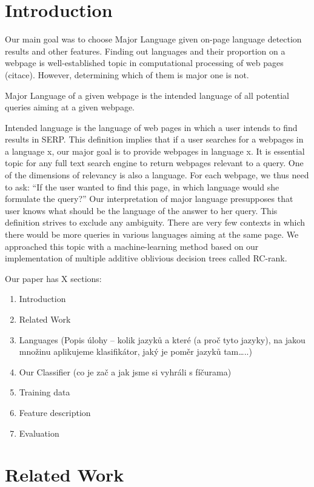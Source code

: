 \documentclass{acm_proc_article-sp}
\begin{document}
\section{Introduction}
  Our main goal was to choose Major Language given on-page language detection results and other features. Finding out languages and their proportion on a webpage is well-established topic in computational processing of web pages (citace). However, determining which of them is major one is not.

  Major Language of a given webpage is the intended language of all potential queries aiming at a given webpage. 

  Intended language is the language of web pages in which a user intends to find results in SERP. This definition implies that if a user searches for a webpages in a language x, our major goal is to provide webpages in language x.
  It is essential topic for any full text search engine to return webpages relevant to a query. One of the dimensions of relevancy is also a language. For each webpage, we thus need to ask: “If the user wanted to find this page, in which language would she formulate the query?” Our interpretation of major language presupposes that user knows what should be the language of the answer to her query.
  This definition strives to exclude any ambiguity. There are very few contexts in which there would be more queries in various languages aiming at the same page.
  We approached this topic with a machine-learning method based on our implementation of multiple additive oblivious decision trees called RC-rank.


  Our paper has X sections:
  \begin{enumerate}
  \item Introduction
  \item Related Work
  \item Languages (Popis úlohy – kolik jazyků a které (a proč tyto jazyky), na jakou množinu aplikujeme klasifikátor, jaký je poměr jazyků tam…..)

  \item Our Classifier  (co je zač a jak jsme si vyhráli s fíčurama)
  \item Training data
  \item Feature description
  
  \item Evaluation
  \end{enumerate}
  
\section{Related Work}
\end{document}
